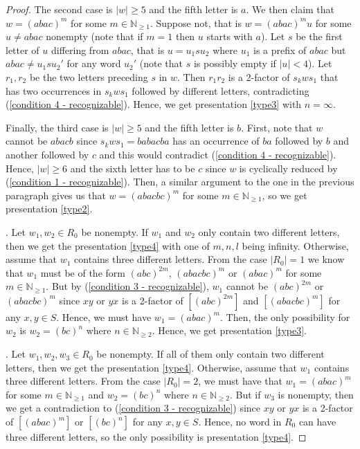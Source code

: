 \documentclass[A4paper, oneside]{amsart}
\newcommand{\N}{\mathbb{N}}
\theoremstyle{definition}
\begin{document}
\begin{proof}
    The second case is $|w|\geq 5$ and the fifth letter is $a$. We then claim that $w = (abac)^m$ for some $m\in \N_{\geq 1}$. Suppose not, that is $w = (abac)^mu$ for some $u \neq abac$ nonempty (note that if $m=1$ then $u$ starts with $a$). Let $s$ be the first letter of $u$ differing from $abac$, that is $u=u_1su_2$ where $u_1$ is a prefix of $abac$ but $abac \neq u_1su_2'$ for any word $u_2'$ (note that $s$ is possibly empty if $|u|<4$). Let $r_1,r_2$ be the two letters preceding $s$ in $w$. Then $r_1r_2$ is a 2-factor of $s_kws_1$ that has two occurrences in $s_kws_1$ followed by different letters, contradicting (\ref{condition 4 - recognizable}). Hence, we get presentation \ref{type3} with $n=\infty$. 
    
    Finally, the third case is $|w|\geq 5$ and the fifth letter is $b$. First, note that $w$ cannot be $abacb$ since $s_kws_1 = babacba$ has an occurrence of $ba$ followed by $b$ and another followed by $c$ and this would contradict (\ref{condition 4 - recognizable}). Hence, $|w|\geq 6$ and the sixth letter has to be $c$ since $w$ is cyclically reduced by (\ref{condition 1 - recognizable}). Then, a similar argument to the one in the previous paragraph gives us that $w = (abacbc)^m$ for some $m\in \N_{\geq 1}$, so we get presentation \ref{type2}.


    \smallskip
    . Let $w_1,w_2 \in R_0$ be nonempty. If $w_1$ and $w_2$ only contain two different letters, then we get the presentation \ref{type4} with one of $m,n,l$ being infinity. Otherwise, assume that $w_1$ contains three different letters. From the case $|R_0|= 1$ we know that $w_1$ must be of the form $(abc)^{2m}$, $(abacbc)^m$ or $(abac)^m$ for some $m \in  \N_{\geq 1}$. But by (\ref{condition 3 - recognizable}), $w_1$ cannot be $(abc)^{2m}$ or  $(abacbc)^m$ since $xy$ or $yx$ is a 2-factor of $[(abc)^{2m}]$ and $[(abacbc)^m]$ for any $x,y \in S$. Hence, we must have $w_1 = (abac)^m$. Then, the only possibility for $w_2$ is $w_2 = (bc)^n$ where $n \in  \N_{\geq 2}$. Hence, we get presentation \ref{type3}.

    \smallskip
    . Let $w_1,w_2,w_3 \in R_0$ be nonempty. If all of them only contain two different letters, then we get the presentation \ref{type4}. Otherwise, assume that $w_1$ contains three different letters. From the case $|R_0| = 2$, we must have that $w_1 = (abac)^m$ for some $m \in  \N_{\geq 1}$ and $w_2 = (bc)^n$ where $n \in  \N_{\geq 2}$. But if $w_3$ is nonempty, then we get a contradiction to (\ref{condition 3 - recognizable}) since $xy$ or $yx$ is a 2-factor of $[(abac)^m]$ or $[(bc)^n]$ for any $x,y \in S$. Hence, no word in $R_0$ can have three different letters, so the only possibility is presentation \ref{type4}.
  \end{proof}
  
\end{document}
